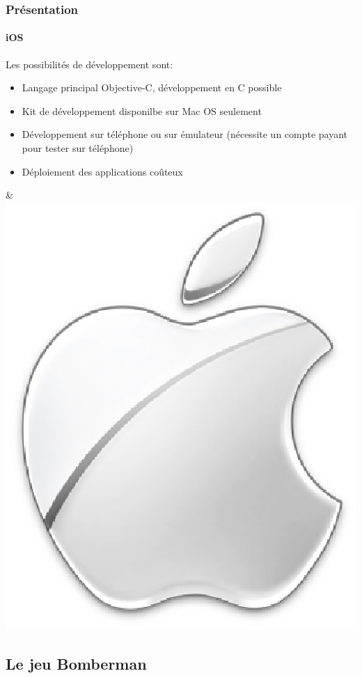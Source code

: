 \begin{frame}
\frametitle{Présentation}
\framesubtitle{iOS}
	\begin{minipage}{8cm}
	Les possibilités de développement sont: \\ 

	\begin{itemize}
		\item Langage principal Objective-C, développement en C possible
		\item Kit de développement disponilbe sur Mac OS seulement
		\item Développement sur téléphone ou sur émulateur (nécessite un compte payant pour tester sur téléphone)
		\item Déploiement des applications coûteux
	\end{itemize}
	\end{minipage} & \includegraphics[scale=0.2]{img/apple.eps} 
\end{frame}


\subsection{Le jeu Bomberman}



